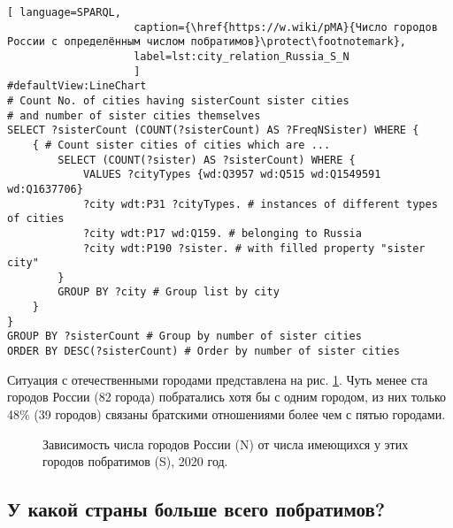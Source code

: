 \begin{lstlisting}[ language=SPARQL, 
                    caption={\href{https://w.wiki/pMA}{Число городов России с определённым числом побратимов}\protect\footnotemark},
                    label=lst:city_relation_Russia_S_N
                    ]
#defaultView:LineChart                                                   
# Count No. of cities having sisterCount sister cities  
# and number of sister cities themselves
SELECT ?sisterCount (COUNT(?sisterCount) AS ?FreqNSister) WHERE {                                                                                  
	{ # Count sister cities of cities which are ...
		SELECT (COUNT(?sister) AS ?sisterCount) WHERE {    
			VALUES ?cityTypes {wd:Q3957 wd:Q515 wd:Q1549591 wd:Q1637706}
			?city wdt:P31 ?cityTypes. # instances of different types of cities
			?city wdt:P17 wd:Q159. # belonging to Russia
			?city wdt:P190 ?sister. # with filled property "sister city"
		}
		GROUP BY ?city # Group list by city                             
	}
}
GROUP BY ?sisterCount # Group by number of sister cities
ORDER BY DESC(?sisterCount) # Order by number of sister cities                                  
\end{lstlisting}

Ситуация с отечественными городами представлена на рис. \ref{fig:city_relation_Russia_S_N}. Чуть менее ста городов России (82 города) побратались хотя бы с одним городом, из них только 48\% (39 городов) связаны братскими отношениями более чем с пятью городами.

\begin{figure}
{
\setlength{\fboxsep}{0pt}%
\setlength{\fboxrule}{1pt}%
}
  \caption{Зависимость числа городов России (N) от числа имеющихся у этих городов побратимов (S), 2020 год.}
  \label{fig:city_relation_Russia_S_N}
\end{figure}

\subsection{У какой страны больше всего побратимов?}

